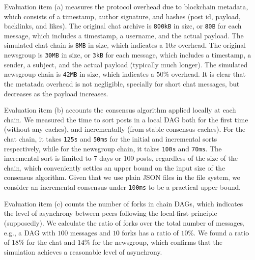 \documentclass[12pt]{article}
\newcommand{\code}[1]  {\texttt{\footnotesize{#1}}}
\begin{document}
Evaluation item (a) measures the protocol overhead due to blockchain metadata,
which consists of a timestamp, author signature, and hashes (post id, payload,
backlinks, and likes).
%
The original chat archive is \texttt{800kB} in size, or \texttt{80B} for each
message, which includes a timestamp, a username, and the actual payload.
The simulated chat chain is \texttt{8MB} in size, which indicates a $10x$
overhead.
The original newsgroup is \texttt{30MB} in size, or \texttt{3kB} for each
message, which includes a timestamp, a sender, a subject, and the actual
payload (typically much longer).
The simulated newsgroup chain is \texttt{42MB} in size, which indicates a
$50\%$ overhead.
%
It is clear that the metatada overhead is not negligible, specially for short
chat messages, but decreases as the payload increases.

Evaluation item (b) accounts the consensus algorithm applied locally at each
chain.
We measured the time to sort posts in a local DAG both for the first time
(without any caches), and incrementally (from stable consensus caches).
%
For the chat chain, it takes \texttt{125s} and \texttt{50ms} for the initial
and incremental sorts respectively, while for the newsgroup chain, it takes
\texttt{100s} and \texttt{70ms}.
%
%
The incremental sort is limited to 7 days or 100 posts, regardless of the size
of the chain, which conveniently settles an upper bound on the input size of
the consensus algorithm.
%
Given that we use plain JSON files in the file system, we consider an
incremental consensus under \texttt{100ms} to be a practical upper bound.

Evaluation item (c) counts the number of forks in chain DAGs, which indicates
the level of asynchrony between peers following the local-first principle
(supposedly).
We calculate the ratio of forks over the total number of messages, e.g., a DAG
with $100$ messages and $10$ forks has a ratio of $10\%$.
We found a ratio of $18\%$ for the chat and $14\%$ for the newsgroup, which
confirms that the simulation achieves a reasonable level of asynchrony.
\end{document}
